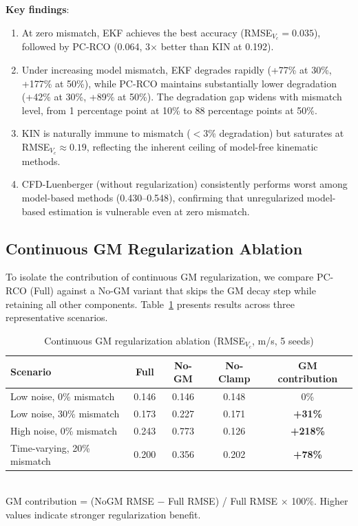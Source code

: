 \textbf{Key findings}:
\begin{enumerate}[itemsep=0pt,topsep=4pt]
    \item At zero mismatch, EKF achieves the best accuracy (RMSE$_{V_c}=0.035$), followed by PC-RCO (0.064, 3$\times$ better than KIN at 0.192).
    \item Under increasing model mismatch, EKF degrades rapidly (+77\% at 30\%, +177\% at 50\%), while PC-RCO maintains substantially lower degradation (+42\% at 30\%, +89\% at 50\%). The degradation gap widens with mismatch level, from 1 percentage point at 10\% to 88 percentage points at 50\%.
    \item KIN is naturally immune to mismatch ($<$3\% degradation) but saturates at RMSE$_{V_c}\approx0.19$, reflecting the inherent ceiling of model-free kinematic methods.
    \item CFD-Luenberger (without regularization) consistently performs worst among model-based methods (0.430--0.548), confirming that unregularized model-based estimation is vulnerable even at zero mismatch.
\end{enumerate}

\subsection{Continuous GM Regularization Ablation}

To isolate the contribution of continuous GM regularization, we compare PC-RCO (Full) against a No-GM variant that skips the GM decay step while retaining all other components. Table~\ref{tab:gm_ablation} presents results across three representative scenarios.

\begin{table}[h]
\centering
\caption{Continuous GM regularization ablation (RMSE$_{V_c}$, m/s, 5 seeds)}
\label{tab:gm_ablation}
\begin{tabular}{lccc|c}
\toprule
Scenario & Full & No-GM & No-Clamp & GM contribution \\
\midrule
Low noise, 0\% mismatch     & 0.146 & 0.146 & 0.148 & 0\% \\
Low noise, 30\% mismatch    & 0.173 & 0.227 & 0.171 & \textbf{+31\%} \\
High noise, 0\% mismatch    & 0.243 & 0.773 & 0.126 & \textbf{+218\%} \\
Time-varying, 20\% mismatch & 0.200 & 0.356 & 0.202 & \textbf{+78\%} \\
\bottomrule
\end{tabular}
\\[4pt]
\footnotesize{GM contribution = (NoGM RMSE $-$ Full RMSE) / Full RMSE $\times$ 100\%. Higher values indicate stronger regularization benefit.}
\end{table}

